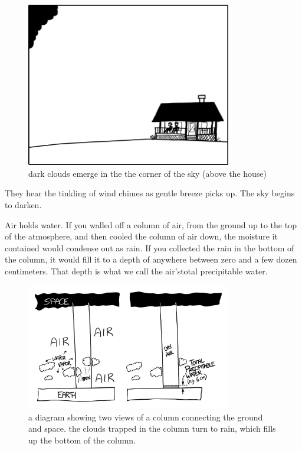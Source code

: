 \begin{figure}[!htbp]
\centering
\includegraphics[scale=0.5, max width=0.8\textwidth]{imgs/a/12/raindrop_first_clouds.png}
\caption{dark clouds emerge in the the corner of the sky (above the house)}
\end{figure}

{They hear the tinkling of wind chimes as gentle breeze picks up. The sky begins to darken.}

{Air holds water. If you walled off a column of air, from the ground up to the top of the atmosphere, and then cooled the column of air down, the moisture it contained would condense out as rain. If you collected the rain in the bottom of the column, it would fill it to a depth of anywhere between zero and a few dozen centimeters. That depth is what we call the air’stotal precipitable water.}

\begin{figure}[!htbp]
\centering
\includegraphics[scale=0.5, max width=0.8\textwidth]{imgs/a/12/raindrop_tpw.png}
\caption{a diagram showing two views of a column connecting the ground and space. the clouds trapped in the column turn to rain, which fills up the bottom of the column.}
\end{figure}

